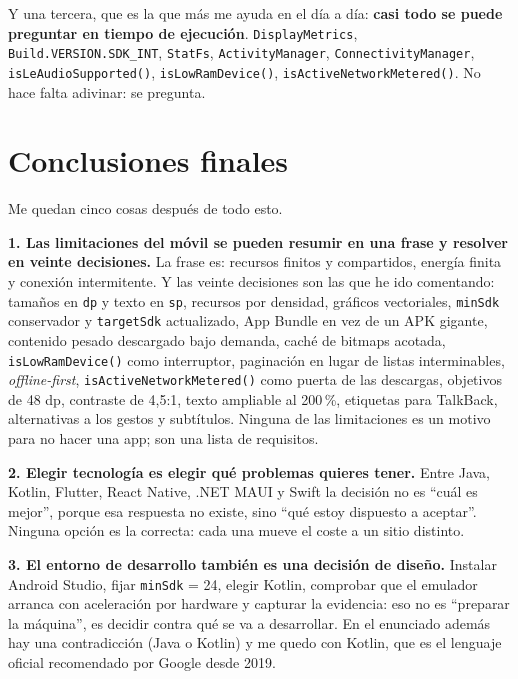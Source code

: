 \documentclass[11pt,a4paper]{article}
\newcommand{\code}[1]{\texttt{\color{ink}#1}}
\begin{document}
	Y una tercera, que es la que más me ayuda en el día a día: \textbf{casi todo se puede preguntar en tiempo de ejecución}. \code{DisplayMetrics}, \code{Build.VERSION.SDK\_INT}, \code{StatFs}, \code{ActivityManager}, \code{ConnectivityManager}, \code{isLeAudioSupported()}, \code{isLowRamDevice()}, \code{isActiveNetworkMetered()}. No hace falta adivinar: se pregunta.
	
	\newpage
	\section*{Conclusiones finales}
	
	Me quedan cinco cosas después de todo esto.
	
	\textbf{1. Las limitaciones del móvil se pueden resumir en una frase y resolver en veinte decisiones.} La frase es: recursos finitos y compartidos, energía finita y conexión intermitente. Y las veinte decisiones son las que he ido comentando: tamaños en \code{dp} y texto en \code{sp}, recursos por densidad, gráficos vectoriales, \code{minSdk} conservador y \code{targetSdk} actualizado, App Bundle en vez de un APK gigante, contenido pesado descargado bajo demanda, caché de bitmaps acotada, \code{isLowRamDevice()} como interruptor, paginación en lugar de listas interminables, \emph{offline-first}, \code{isActiveNetworkMetered()} como puerta de las descargas, objetivos de 48 dp, contraste de 4,5:1, texto ampliable al 200\,\%, etiquetas para TalkBack, alternativas a los gestos y subtítulos. Ninguna de las limitaciones es un motivo para no hacer una app; son una lista de requisitos.
	
	\textbf{2. Elegir tecnología es elegir qué problemas quieres tener.} Entre Java, Kotlin, Flutter, React Native, .NET MAUI y Swift la decisión no es \enquote{cuál es mejor}, porque esa respuesta no existe, sino \enquote{qué estoy dispuesto a aceptar}. Ninguna opción es la correcta: cada una mueve el coste a un sitio distinto.
	
	\textbf{3. El entorno de desarrollo también es una decisión de diseño.} Instalar Android Studio, fijar \code{minSdk} = 24, elegir Kotlin, comprobar que el emulador arranca con aceleración por hardware y capturar la evidencia: eso no es \enquote{preparar la máquina}, es decidir contra qué se va a desarrollar. En el enunciado además hay una contradicción (Java o Kotlin) y me quedo con Kotlin, que es el lenguaje oficial recomendado por Google desde 2019.
	
\end{document}
